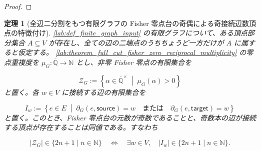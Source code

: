 \documentclass[11pt,a4paper]{article}
\newtheorem{theorem}[definition]{定理}
\theoremstyle{remark}
\begin{document}
\begin{proof}
\end{proof}

\begin{theorem}[全辺二分割をもつ有限グラフの Fisher 零点台の奇偶による奇接続辺数頂点の特徴付け]\label{lab:theorem_full_cut_fisher_zero_support_parity_characterization}
\cref{lab:def_finite_graph_input}
 の有限グラフについて、ある頂点部分集合 
$A\subseteq V$
 が存在し、全ての辺の二端点のうちちょうど一方だけが 
$A$
 に属すると仮定する。
\cref{lab:theorem_full_cut_fisher_zero_reciprocal_multiplicity}
 の零点重複度を 
$\mu_G:\overline{\mathbb Q}\to\mathbb N$
 とし、非零 Fisher 零点の有限集合を

\[\mathcal Z_G:=
\left\{
  \alpha\in\overline{\mathbb Q}^{\times}
  \;\middle|\;
  \mu_G(\alpha)>0
\right\}\]
と置く。各 
$w\in V$
 に接続する辺の有限集合を

\[I_w:=
\left\{
  e\in E
  \;\middle|\;
  \partial_G(e,\mathsf{source})=w
  \quad\text{または}\quad
  \partial_G(e,\mathsf{target})=w
\right\}\]
と置く。このとき、Fisher 零点台の元数が奇数であることと、奇数本の辺が接続する頂点が存在することは同値である。すなわち

\[|\mathcal Z_G|\in\{2n+1\mid n\in\mathbb N\}
\quad\Longleftrightarrow\quad
\exists w\in V,\quad |I_w|\in\{2n+1\mid n\in\mathbb N\}.\]
\end{theorem}
\end{document}

